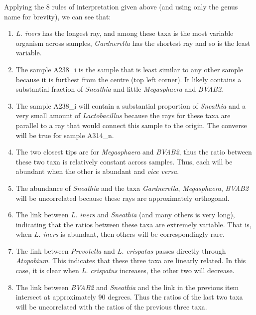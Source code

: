 \documentclass[11pt]{article}\usepackage[]{graphicx}\usepackage[]{color}
\begin{document}
Applying the 8 rules of interpretation given above (and using only the genus name for brevity), we can see that:

\begin{enumerate}
\item \emph{L. iners} has the longest ray, and among these taxa is the most variable organism across samples, \emph{Gardnerella} has the shortest ray and so is the least variable.

\item The sample A238\_i is the sample that is least similar to any other sample because it is furthest from the centre (top left corner). It likely contains a substantial fraction of \emph{Sneathia} and little \emph{Megasphaera} and \emph{BVAB2}.

\item The sample A238\_i will contain a substantial proportion of \emph{Sneathia} and a very small amount of \emph{Lactobacillus} because the rays for these taxa are parallel to a ray that would connect this sample to the origin. The converse will be true for sample A314\_n. 

\item The two closest tips are for \emph{Megasphaera} and \emph{BVAB2}, thus the ratio between these two taxa is relatively constant across samples. Thus, each will be abundant when the other is abundant and \emph{vice versa}.

\item The abundance of \emph{Sneathia} and the taxa \emph{Gardnerella}, \emph{Megasphaera}, \emph{BVAB2} will be uncorrelated because these rays are approximately orthogonal.

\item The link between \emph{L. iners} and \emph{Sneathia} (and many others is very long), indicating that the ratios between these taxa are extremely variable. That is, when \emph{L. iners} is abundant, then others will be correspondingly rare.

\item The link between \emph{Prevotella} and \emph{L. crispatus} passes directly through \emph{Atopobium}. This indicates that these three taxa are linearly related. In this case, it is clear when \emph{L. crispatus} increases, the other two will decrease. 

\item The link between \emph{BVAB2} and \emph{Sneathia} and the link in the previous item intersect at approximately 90 degrees. Thus the ratios of the last two taxa will be uncorrelated with the ratios of the previous three taxa.

\end{enumerate}
\end{document}
